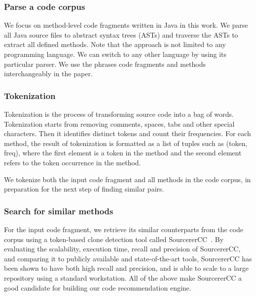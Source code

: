 \subsubsection{Parse a code corpus}
We focus on method-level code fragments written in Java in this work. We parse all Java source files to abstract syntax trees (ASTs) and traverse the ASTs to extract all defined methods. Note that the approach is not limited to any programming language. We can switch to any other language by using its particular parser. We use the phrases code fragments and methods interchangeably in the paper.

\subsubsection{Tokenization}
Tokenization is the process of transforming source code into a bag of words. Tokenization starts from removing comments, spaces, tabs and other special characters. Then it identifies distinct tokens and count their frequencies. For each method, the result of tokenization is formatted as a list of tuples such as {\ttt (token, freq)}, where the first element is a token in the method and the second element refers to the token occurrence in the method.

We tokenize both the input code fragment and all methods in the code corpus, in preparation for the next step of finding similar pairs.

\subsubsection{Search for similar methods}
For the input code fragment, we retrieve its similar counterparts from the code corpus using a token-based clone detection tool called SourcererCC~\cite{sajnani2016sourcerercc}. By evaluating the scalability, execution time, recall and precision of SourcererCC, and comparing it to publicly available and state-of-the-art tools, SourcererCC has been shown to have both high recall and precision, and is able to scale to a large repository using a standard workstation. All of the above make SourcererCC a good candidate for building our code recommendation engine. 


